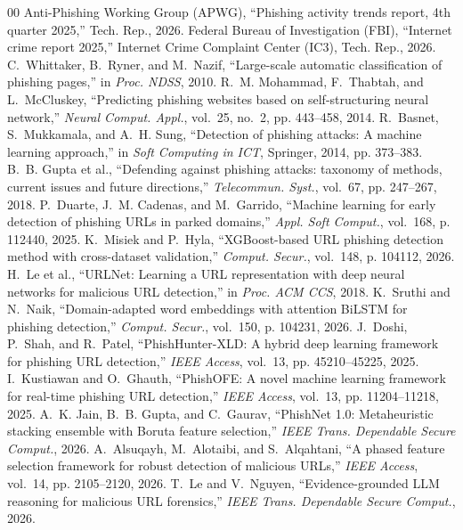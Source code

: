 \documentclass[conference]{IEEEtran}
\begin{document}
\begin{thebibliography}{00}
 Anti-Phishing Working Group (APWG), ``Phishing activity trends report, 4th quarter 2025,'' Tech. Rep., 2026.
 Federal Bureau of Investigation (FBI), ``Internet crime report 2025,'' Internet Crime Complaint Center (IC3), Tech. Rep., 2026.
 C.~Whittaker, B.~Ryner, and M.~Nazif, ``Large-scale automatic classification of phishing pages,'' in \emph{Proc. NDSS}, 2010.
 R.~M. Mohammad, F.~Thabtah, and L.~McCluskey, ``Predicting phishing websites based on self-structuring neural network,'' \emph{Neural Comput. Appl.}, vol.~25, no.~2, pp. 443--458, 2014.
 R.~Basnet, S.~Mukkamala, and A.~H. Sung, ``Detection of phishing attacks: A machine learning approach,'' in \emph{Soft Computing in ICT}, Springer, 2014, pp. 373--383.
 B.~B. Gupta et al., ``Defending against phishing attacks: taxonomy of methods, current issues and future directions,'' \emph{Telecommun. Syst.}, vol.~67, pp. 247--267, 2018.
 P.~Duarte, J.~M. Cadenas, and M.~Garrido, ``Machine learning for early detection of phishing URLs in parked domains,'' \emph{Appl. Soft Comput.}, vol.~168, p. 112440, 2025.
 K.~Misiek and P.~Hyla, ``XGBoost-based URL phishing detection method with cross-dataset validation,'' \emph{Comput. Secur.}, vol.~148, p. 104112, 2026.
 H.~Le et al., ``URLNet: Learning a URL representation with deep neural networks for malicious URL detection,'' in \emph{Proc. ACM CCS}, 2018.
 K.~Sruthi and N.~Naik, ``Domain-adapted word embeddings with attention BiLSTM for phishing detection,'' \emph{Comput. Secur.}, vol.~150, p. 104231, 2026.
 J.~Doshi, P.~Shah, and R.~Patel, ``PhishHunter-XLD: A hybrid deep learning framework for phishing URL detection,'' \emph{IEEE Access}, vol.~13, pp. 45210--45225, 2025.
 I.~Kustiawan and O.~Ghauth, ``PhishOFE: A novel machine learning framework for real-time phishing URL detection,'' \emph{IEEE Access}, vol.~13, pp. 11204--11218, 2025.
 A.~K. Jain, B.~B. Gupta, and C.~Gaurav, ``PhishNet 1.0: Metaheuristic stacking ensemble with Boruta feature selection,'' \emph{IEEE Trans. Dependable Secure Comput.}, 2026.
 A.~Alsuqayh, M.~Alotaibi, and S.~Alqahtani, ``A phased feature selection framework for robust detection of malicious URLs,'' \emph{IEEE Access}, vol.~14, pp. 2105--2120, 2026.
 T.~Le and V.~Nguyen, ``Evidence-grounded LLM reasoning for malicious URL forensics,'' \emph{IEEE Trans. Dependable Secure Comput.}, 2026.
\end{thebibliography}
\end{document}
